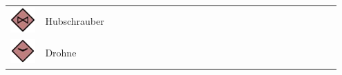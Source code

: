 \begin{longtable}{C{0.1\linewidth} m{0.85\linewidth}}
	\includegraphics[scale=0.8]{./img/fortgeschrittenes/karteUndMarkierungen/Hubschrauber.png}	&	 Hubschrauber \\
	\includegraphics[scale=0.8]{./img/fortgeschrittenes/karteUndMarkierungen/Drohne.png}	& 	Drohne \\
\end{longtable}